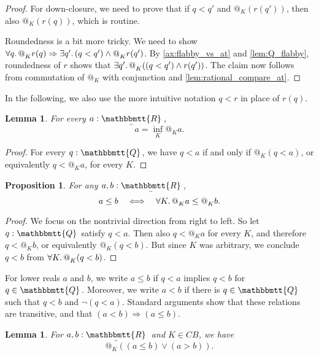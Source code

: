 \documentclass[11pt, oneside, article]{memoir}
\makeatletter
\newcommand{\tob}[1]{\todo[color=blue!40,inline]{\textbf{T:} #1}}
\theoremstyle{plain}
\newtheorem{proposition}[theorem]{Proposition}
\newtheorem{lemma}[theorem]{Lemma}
\theoremstyle{definition}
\theoremstyle{remark}
\newcommand{\ubar}[1]{\underaccent{\bar}{#1}}
\newcommand{\internal}[1]{\raisebox{-.03ex}{$\mathbbmtt{#1}$}}
\newcommand{\hs}{\hspace{1.1pt}}
\newcommand{\tQQ}{\internal{Q}\hs}
\newcommand{\tRR}{\internal{R}\hs}
\newcommand{\tLR}{\ubar{\tRR}\hs}
\newcommand{\BaseSpace}{B}
\newcommand{\CB}{C\BaseSpace}
\newcommand{\AtSymbol}{{@}}
\newcommand{\At}[2][]{\AtSymbol^{#1}_{#2}}
\newcommand{\imp}{\Rightarrow}
\makeatother
\begin{document}
\begin{proof}
	For down-closure, we need to prove that if $q < q'$ and $\At{K}(r(q'))$, then also $\At{K}(r(q))$, which is routine.

	Roundedness is a bit more tricky. We need to show $\forall q\ldotp \At{K} r(q) \imp \exists q'\ldotp (q < q') \land \At{K} r(q')$. By \cref{ax:flabby_vs_at} and \cref{lem:Q_flabby}, roundedness of $r$ shows that $\exists q'\ldotp \At{K}((q < q') \land r(q'))$. The claim now follows from commutation of $\At{K}$ with conjunction and \cref{lem:rational_compare_at}.
\end{proof}

In the following, we also use the more intuitive notation $q < r$ in place of $r(q)$.

\begin{lemma}
	For every $a : \tLR$,
	\[
		a = \inf_K \At{K} a.
	\]
	\label{lem:lower_reals_local}
\end{lemma}

\begin{proof}
	For every $q : \tQQ$, we have $q < a$ if and only if $\At{K}(q < a)$, or equivalently $q < \At{K}a$, for every $K$.
\end{proof}

\begin{proposition}\label{enough_points_LR}
For any $a,b:\tLR$,
\[
	a \leq b \quad \Longleftrightarrow \quad \forall K\ldotp \At{K} a \leq \At{K} b.
\]
\end{proposition}

\begin{proof}
	We focus on the nontrivial direction from right to left. So let $q:\tQQ$ satisfy $q < a$. Then also $q < \At{K} a$ for every $K$, and therefore $q < \At{K}b$, or equivalently $\At{K}(q < b)$. But since $K$ was arbitrary, we conclude $q < b$ from $\forall K\ldotp \At{K}(q < b)$.
\end{proof}

\tob{Work in progress}

For lower reals $a$ and $b$, we write $a\leq b$ if $q < a$ implies $q < b$ for $q\in\tQQ$. Moreover, we write $a < b$ if there is $q\in\tQQ$ such that $q < b$ and $\lnot(q < a)$. Standard arguments show that these relations are transitive, and that $(a < b) \imp (a \leq b)$.

\begin{lemma}
	For $a,b : \tLR$ and $K\in\CB$, we have
	\[
		\At{K}((a \leq b) \lor (a > b)).
	\]
\end{lemma}
\end{document}
